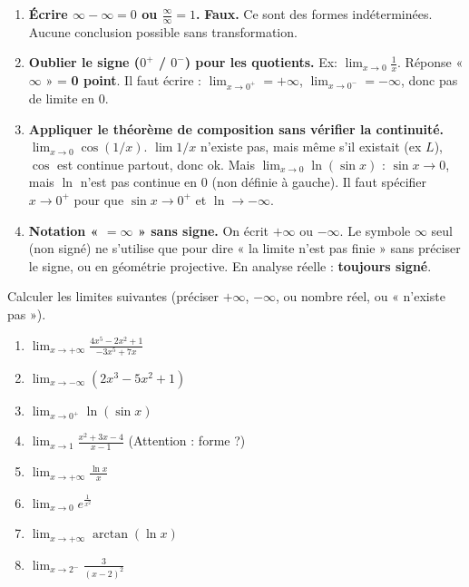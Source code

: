 \documentclass[11pt]{article}
\newcommand{\cle}[1]{{\popxbold\color{popdark}#1}}
\begin{document}
\begin{attention}
\begin{enumerate}
    \item \textbf{Écrire $\infty - \infty = 0$ ou $\frac{\infty}{\infty} = 1$.} \textbf{Faux.} Ce sont des \cle{formes indéterminées}. Aucune conclusion possible sans transformation.
    \item \textbf{Oublier le signe ($0^+$ / $0^-$) pour les quotients.} Ex: $\lim_{x \to 0} \frac{1}{x}$. Réponse « $\infty$ » = \textbf{0 point}. Il faut écrire : $\lim_{x \to 0^+} = +\infty$, $\lim_{x \to 0^-} = -\infty$, donc pas de limite en $0$.
    \item \textbf{Appliquer le théorème de composition sans vérifier la continuité.}$\lim_{x \to 0} \cos(1/x)$. $\lim 1/x$ n'existe pas, mais même s'il existait (ex $L$), $\cos$ est continue partout, donc ok. Mais $\lim_{x \to 0} \ln(\sin x)$ : $\sin x \to 0$, mais $\ln$ n'est pas continue en $0$ (non définie à gauche). Il faut spécifier $x \to 0^+$ pour que $\sin x \to 0^+$ et $\ln \to -\infty$.
    \item \textbf{Notation « $= \infty$ » sans signe.} On écrit $+\infty$ ou $-\infty$. Le symbole $\infty$ seul (non signé) ne s'utilise que pour dire « la limite n'est pas finie » sans préciser le signe, ou en géométrie projective. En analyse réelle : \textbf{toujours signé}.
\end{enumerate}
\end{attention}

\begin{exercice}
Calculer les limites suivantes (préciser $+\infty$, $-\infty$, ou nombre réel, ou « n'existe pas »).
\begin{enumerate}
    \item $\lim_{x \to +\infty} \frac{4x^5 - 2x^2 + 1}{-3x^5 + 7x}$
    \item $\lim_{x \to -\infty} (2x^3 - 5x^2 + 1)$
    \item $\lim_{x \to 0^+} \ln(\sin x)$
    \item $\lim_{x \to 1} \frac{x^2 + 3x - 4}{x - 1}$ (Attention : forme ?)
    \item $\lim_{x \to +\infty} \frac{\ln x}{x}$
    \item $\lim_{x \to 0} e^{\frac{1}{x^2}}$
    \item $\lim_{x \to +\infty} \arctan(\ln x)$
    \item $\lim_{x \to 2^-} \frac{3}{(x-2)^2}$
\end{enumerate}
\end{exercice}
\end{document}
